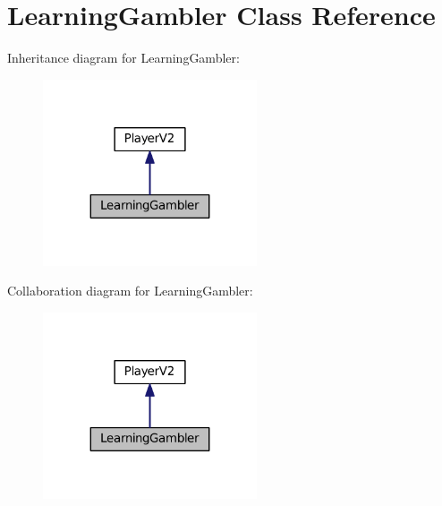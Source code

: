 \hypertarget{classLearningGambler}{}\section{Learning\+Gambler Class Reference}
\label{classLearningGambler}


Inheritance diagram for Learning\+Gambler\+:\nopagebreak
\begin{figure}[H]
\begin{center}
\leavevmode
\includegraphics[width=179pt]{classLearningGambler__inherit__graph}
\end{center}
\end{figure}


Collaboration diagram for Learning\+Gambler\+:\nopagebreak
\begin{figure}[H]
\begin{center}
\leavevmode
\includegraphics[width=179pt]{classLearningGambler__coll__graph}
\end{center}
\end{figure}
